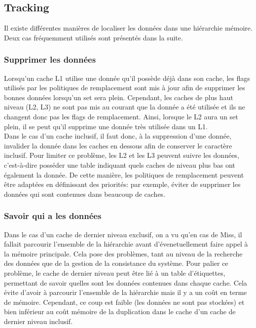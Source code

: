 \documentclass[a4paper]{article}
\begin{document}
\subsection{Tracking}
\indent Il existe différentes manières de localiser les données dans une hiérarchie mémoire. Deux cas fréquemment utilisés sont présentés dans la suite.

\subsubsection{Supprimer les données}
\indent Lorsqu'un cache L1 utilise une donnée qu'il possède déjà dans son cache, les flags utilisés par les politiques de remplacement sont mis à jour afin de supprimer les bonnes données lorsqu'un set sera plein. Cependant, les caches de plus haut niveau (L2, L3) ne sont pas mis au courant que la donnée a été utilisée et ils ne changent donc pas les flags de remplacement. Ainsi, lorsque le L2 aura un set plein, il se peut qu'il supprime une donnée très utilisée dans un L1. \\

\indent Dans le cas d'un cache inclusif, il faut donc, à la suppression d'une donnée, invalider la donnée dans les caches en dessous afin de conserver le caractère inclusif. Pour limiter ce problème, les L2 et les L3 peuvent suivre les données, c'est-à-dire posséder une table indiquant quels caches de niveau plus bas ont également la donnée. De cette manière, les politiques de remplacement peuvent être adaptées en définissant des priorités: par exemple, éviter de supprimer les données qui sont contenues dans beaucoup de caches.

\subsubsection{Savoir qui a les données}
\indent Dans le cas d'un cache de dernier niveau exclusif, on a vu qu'en cas de Miss, il fallait parcourir l'ensemble de la hiérarchie avant d'évenetuellement faire appel à la mémoire principale. Cela pose des problèmes, tant au niveau de la recherche des données que de la gestion de la consistance du système. Pour palier ce problème, le cache de dernier niveau peut être lié à un table d'étiquettes, permettant de savoir quelles sont les données contenues dans chaque cache. Cela évite d'avoir à parcourir l'ensemble de la hiérarchie mais il y a un coût en terme de mémoire. Cependant, ce coup est faible (les données ne sont pas stockées) et bien inférieur au coût mémoire de la duplication dans le cache d'un cache de dernier niveau inclusif.
\end{document}
